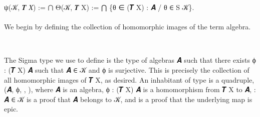 \documentclass[a4paper,UKenglish,cleveref,autoref,thm-restate]{lipics-v2021}
\begin{document}
\af ψ(\ab 𝒦, \af 𝑻 \ab 𝑋) := \af ⋂ \af Θ(\ab 𝒦, \af 𝑻 \ab X) := \af ⋂ \{\ab θ \af ∈  (\af 𝑻 \ab X) \as : \ab 𝑨 \af / \ab θ \af ∈ \ad S \ab 𝒦\}.\\
\\
We begin by defining the collection  of homomorphic images of the term algebra.
\ccpad
\begin{code}%
\>[1]\AgdaSpace{}%
\AgdaSymbol{:}\AgdaSpace{}%
\AgdaSpace{}%
\AgdaSymbol{(}\AgdaSpace{}%
\AgdaSpace{}%
\AgdaSymbol{)}\AgdaSpace{}%
\AgdaSymbol{(}\AgdaSpace{}%
\AgdaSymbol{)}\AgdaSpace{}%
\AgdaSpace{}%
\AgdaSpace{}%
\AgdaSpace{}%
\AgdaSpace{}%
\AgdaSpace{}%
\AgdaSymbol{(}\AgdaSpace{}%
\AgdaSpace{}%
\AgdaSymbol{)}\AgdaSpace{}%
\<%
\\
%
\>[1]\AgdaSpace{}%
\AgdaSpace{}%
\AgdaSymbol{=}\AgdaSpace{}%
\AgdaSpace{}%
\AgdaSpace{}%
\AgdaSpace{}%
\AgdaSymbol{(}\AgdaSpace{}%
\AgdaSpace{}%
\AgdaSymbol{)}\AgdaSpace{}%
\AgdaFunction{,}\AgdaSpace{}%
\AgdaSpace{}%
\AgdaSpace{}%
\AgdaSpace{}%
\AgdaSpace{}%
\AgdaSymbol{(}\AgdaSpace{}%
\AgdaSymbol{)}\AgdaSpace{}%
\AgdaSpace{}%
\AgdaFunction{,}\AgdaSpace{}%
\AgdaSymbol{(}\AgdaSpace{}%
\AgdaSpace{}%
\AgdaSymbol{)}\AgdaSpace{}%
\AgdaSpace{}%
\AgdaSpace{}%
\AgdaSpace{}%
\AgdaSpace{}%
\<%
\end{code}
\ccpad
The Sigma type we use to define  is the type of algebras \ab 𝑨 such that there exists \ab ϕ \as :  (\af 𝑻 \ab X) \ab 𝑨 such that \ab 𝑨 \af ∈ \ab 𝒦 and \ab ϕ is surjective. This is precisely the collection of all homomorphic images of \af 𝑻 \ab X, as desired. An inhabitant of type  is a quadruple, (\ab 𝑨, \ab ϕ, , ), where \ab 𝑨 is an algebra, \ab ϕ \as :  (\af 𝑻 \ab X) \ab 𝑨 is a homomorphism from \af 𝑻 \ab X to \ab 𝑨,  \as : \ab 𝑨 \af ∈ \ab 𝒦  is a proof that \ab 𝑨 belongs to \ab 𝒦, and  is a proof that the underlying map  is epic.
\end{document}
